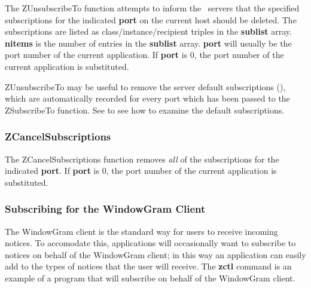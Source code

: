 \etemplate
{}

The ZUnsubscribeTo function attempts to inform the \Zephyr\ servers
that the specified subscriptions for the indicated {\bf port} on the
current host should be deleted.  The subscriptions are listed as
class/instance/recipient triples in the {\bf sublist} array.
{\bf nitems} is the number of entries in the {\bf sublist} array.
{\bf port} will usually be the port number of the current application.
If {\bf port} is 0, the port number of the current application is substituted.

ZUnsubscribeTo may be useful to remove the server default subscriptions
(),
which are automatically recorded for every port which has been passed to
the ZSubscribeTo function.  See  to
see how to examine the default subscriptions.

\subsubsection{ZCancelSubscriptions}
\label{ZCancelSubscriptions}

\etemplate
{}

The ZCancelSubscriptions function removes {\em all\/} of the
subscriptions for the indicated {\bf port}.  If {\bf port} is 0, the
port number of the current application is substituted.

\subsubsection{Subscribing for the WindowGram Client}
\label{subscribing-zwgc}

The WindowGram client is the standard way for users to receive incoming
notices.  To accomodate this, applications will occasionally want to
subscribe to notices on behalf of the WindowGram client; in this way an
application can easily add to the types of notices that the user will
receive.  The {\bf zctl} command is an example of a program that will
subscribe on behalf of the WindowGram client.

